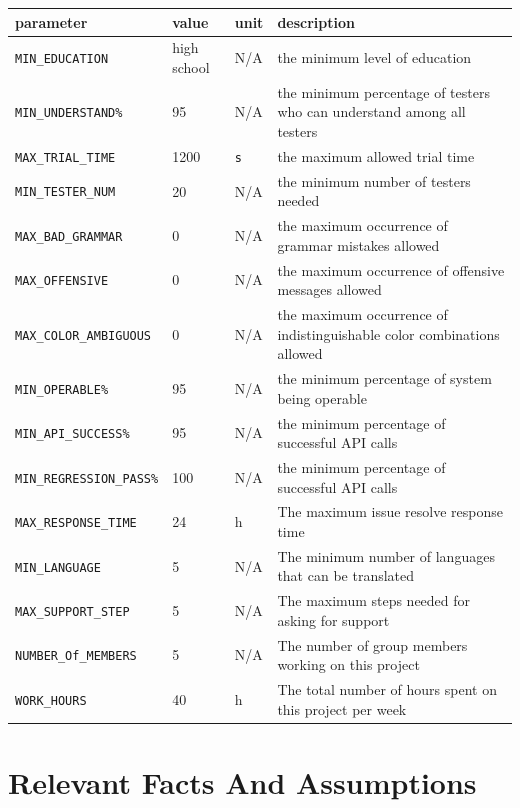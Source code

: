 \documentclass[12pt]{article}
\begin{document}
\begin{tabular}{|l|l|l|p{5cm}|}

\hline
parameter & value & unit & description\\
\hline
\texttt{MIN\_EDUCATION} & high school & N/A & the minimum level of education\\
\hline
\texttt{MIN\_UNDERSTAND\%} & 95 & N/A & the minimum percentage of testers who can understand among all testers\\
\hline
\texttt{MAX\_TRIAL\_TIME} & 1200 & \texttt{s} & the maximum allowed trial time\\
\hline
\texttt{MIN\_TESTER\_NUM} &  20& N/A & the minimum number of testers needed\\
\hline
\texttt{MAX\_BAD\_GRAMMAR} & 0& N/A & the maximum occurrence of grammar mistakes allowed \\
\hline
\texttt{MAX\_OFFENSIVE} & 0& N/A & the maximum occurrence of offensive messages allowed\\
\hline
\texttt{MAX\_COLOR\_AMBIGUOUS} & 0& N/A & the maximum occurrence of indistinguishable color combinations allowed\\
\hline
\texttt{MIN\_OPERABLE\%} & 95 & N/A & the minimum percentage of system being operable \\
\hline
\texttt{MIN\_API\_SUCCESS\%} & 95 & N/A &  the minimum percentage of successful API calls\\
\hline
\texttt{MIN\_REGRESSION\_PASS\%} & 100  & N/A &  the minimum percentage of successful API calls\\
\hline
\texttt{MAX\_RESPONSE\_TIME} & 24 & h & The maximum issue resolve response time\\
\hline
\texttt{MIN\_LANGUAGE}& 5& N/A & The minimum number of languages that can be translated\\
\hline
\texttt{MAX\_SUPPORT\_STEP} & 5&N/A& The maximum steps needed for asking for support\\
\hline
\texttt{NUMBER\_Of\_MEMBERS} & 5&N/A& The number of group members working on this project\\
\hline
\texttt{WORK\_HOURS} & 40 & h & The total number of hours spent on this project per week\\
\hline
\end{tabular}


\section{Relevant Facts And Assumptions}
\end{document}
